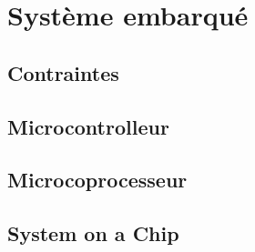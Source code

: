 \section{Système embarqué}
\subsection{Contraintes}
\subsection{Microcontrolleur}
\subsection{Microcoprocesseur}
\subsection{System on a Chip}
